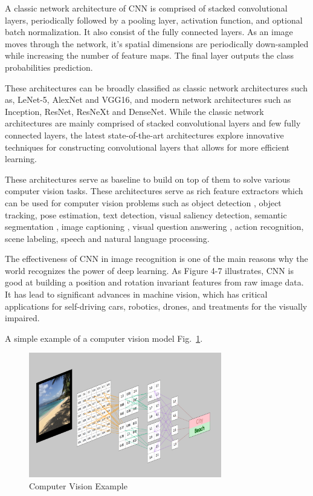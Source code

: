 A classic network architecture of CNN is comprised of stacked convolutional layers, periodically followed by a pooling layer, activation function, and optional batch normalization. It also consist of the fully connected layers. As an image moves through the network, it's spatial dimensions are periodically down-sampled while increasing the number of feature maps. The final layer outputs the class probabilities prediction.

These architectures can be broadly classified as classic network architectures such as, LeNet-5, AlexNet and VGG16, and modern network architectures such as Inception, ResNet, ResNeXt and DenseNet. While the classic network architectures are mainly comprised of stacked convolutional layers and few fully connected layers, the latest state-of-the-art architectures explore innovative techniques for constructing convolutional layers that allows for more efficient learning.

These architectures serve as baseline to build on top of them to solve various computer vision tasks. These architectures serve as rich feature extractors which can be used for computer vision problems such as object detection \cite{edseee.690947520140101}, object tracking, pose estimation, text detection, visual saliency detection, semantic segmentation \cite{edseee.690947520140101}, image captioning \cite{edsarx.1411.455520140101} \cite{edsarx.1411.495220140101} \cite{edseee.778086320160101}, visual question answering \cite{edseee.741063620150101} \cite{edsarx.1505.0561220150101} \cite{Wongsuphasawat2018}, action recognition, scene labeling, speech and natural language processing. 

The effectiveness of CNN in image recognition is one of the main reasons why the world recognizes the power of deep learning. As Figure 4-7 illustrates, CNN is good at building a position and rotation invariant features from raw image data. It has lead to significant advances in machine vision, which has critical applications for self-driving cars, robotics, drones, and treatments for the visually impaired.

A simple example of a computer vision model Fig.~\ref{fig:CNN-2}.
\begin{figure}[htbp]
\centering
\includegraphics[width=0.75\textwidth]{images/CNN.png}
\caption{Computer Vision Example}
\label{fig:CNN-2}
\end{figure}

